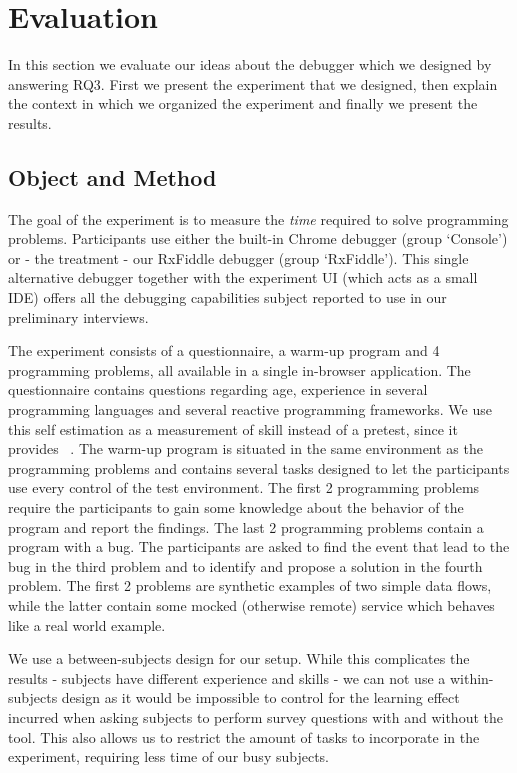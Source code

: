 \section{Evaluation}
In this section we evaluate our ideas about the debugger which we designed by answering RQ3. First we present the experiment that we designed, then explain the context in which we organized the experiment and finally we present the results.

\subsection{Object and Method}
The goal of the experiment is to measure the \textit{time} required to solve programming problems. Participants use either the built-in Chrome debugger (group `Console') or - the treatment - our RxFiddle debugger (group `RxFiddle'). This single alternative debugger together with the experiment UI (which acts as a small IDE) offers all the debugging capabilities subject reported to use in our preliminary interviews.

The experiment consists of a questionnaire, a warm-up program and 4 programming problems, all available in a single in-browser application. The questionnaire contains questions regarding age, experience in several programming languages and several reactive programming frameworks. We use this self estimation as  a measurement of skill instead of a pretest, since it provides ~\cite{kleinschmager2011rate,feigenspan2012measuring,siegmund2014measuring}. The warm-up program is situated in the same environment as the programming problems and contains several tasks designed to let the participants use every control of the test environment. The first 2 programming problems require the participants to gain some knowledge about the behavior of the program and report the findings. The last 2 programming problems contain a program with a bug. The participants are asked to find the event that lead to the bug in the third problem and to identify and propose a solution in the fourth problem. The first 2 problems are synthetic examples of two simple data flows, while the latter contain some mocked (otherwise remote) service which behaves like a real world example.

We use a between-subjects design for our setup. While this complicates the results - subjects have different experience and skills - we can not use a within-subjects design as it would be impossible to control for the learning effect incurred when asking subjects to perform survey questions with and without the tool. This also allows us to restrict the amount of tasks to incorporate in the experiment, requiring less time of our busy subjects.

